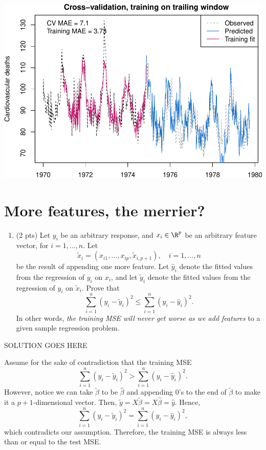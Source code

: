 \documentclass[
]{article}
\providecommand{\tightlist}{%
  \setlength{\itemsep}{0pt}\setlength{\parskip}{0pt}}
\begin{document}
\includegraphics{homework2_files/figure-latex/unnamed-chunk-4-1.pdf}

\hypertarget{more-features-the-merrier}{%
\section{More features, the merrier?}\label{more-features-the-merrier}}

\begin{enumerate}
\def\labelenumi{\arabic{enumi}.}
\setcounter{enumi}{14}
\tightlist
\item
  (2 pts) Let \(y_i\) be an arbitrary response, and \(x_i \in \R^p\) be
  an arbitrary feature vector, for \(i = 1,\dots,n\). Let \[
  \tilde{x}_i = (x_{i1}, \dots, x_{ip}, \tilde{x}_{i,p+1}),\quad i = 1,\dots,n
  \] be the result of appending one more feature. Let \(\hat{y}_i\)
  denote the fitted values from the regression of \(y_i\) on \(x_i\),
  and let \(\tilde{y}_i\) denote the fitted values from the regression
  of \(y_i\) on \(\tilde{x}_i\). Prove that \[
  \sum_{i=1}^n (y_i - \tilde{y}_i)^2 \leq \sum_{i=1}^n (y_i - \hat{y}_i)^2.
  \] In other words, \emph{the training MSE will never get worse as we
  add features} to a given sample regression problem.
\end{enumerate}

SOLUTION GOES HERE

Assume for the sake of contradiction that the training MSE
\[\sum_{i=1}^n (y_i - \tilde{y}_i)^2 > \sum_{i=1}^n (y_i - \hat{y}_i)^2.\]
However, notice we can take \(\tilde{\beta}\) to be \(\hat{\beta}\) and
appending \(0\)'s to the end of \(\tilde{\beta}\) to make it a
\(p+1\)-dimensional vector. Then,
\(\tilde{y} = X\tilde{\beta} = X\hat{\beta} = \hat{y}\). Hence,
\[\sum_{i=1}^n (y_i - \tilde{y}_i)^2 = \sum_{i=1}^n (y_i - \hat{y}_i)^2,\]
which contradicts our assumption. Therefore, the training MSE is always
less than or equal to the test MSE.
\end{document}
